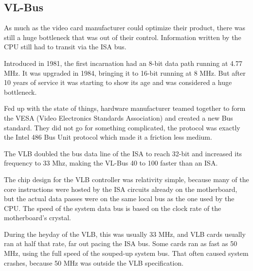 \subsection{VL-Bus}
As much as the video card manufacturer could optimize their product, there was still a huge bottleneck that was out of their control. Information written by the CPU still had to transit via the ISA bus.\\
\par
 Introduced in 1981, the first incarnation had an 8-bit data path running at 4.77 MHz. It was upgraded in 1984, bringing it to 16-bit running at 8 MHz. But after 10 years of service it was starting to show its age and was considered a huge bottleneck.\\
\par
{}
\par
Fed up with the state of things, hardware manufacturer teamed together to form the VESA (Video Electronics Standards Association) and created a new Bus standard. They did not go for something complicated, the protocol was exactly the Intel 486 Bus Unit protocol which made it a friction less medium.\\
\par 
The VLB doubled the bus data line of the ISA to reach 32-bit and increased its frequency to 33 Mhz, making the VL-Bus 40 to 100 faster than an ISA.\\
\par
The chip design for the VLB controller was relativity simple, because many of the core instructions were hosted by the ISA circuits already on the motherboard, but the actual data passes were on the same local bus as the one used by the CPU.
The speed of the system data bus is based on the clock rate of the motherboard's crystal. 
\label{vlbarchitecture}
\par
During the heyday of the VLB, this was usually 33 MHz, and VLB cards usually ran at half that rate, far out pacing the ISA bus. Some cards ran as fast as 50 MHz, using the full speed of the souped-up system bus. That often caused system crashes, because 50 MHz was outside the VLB specification.\\
\par
{}\\
\par

